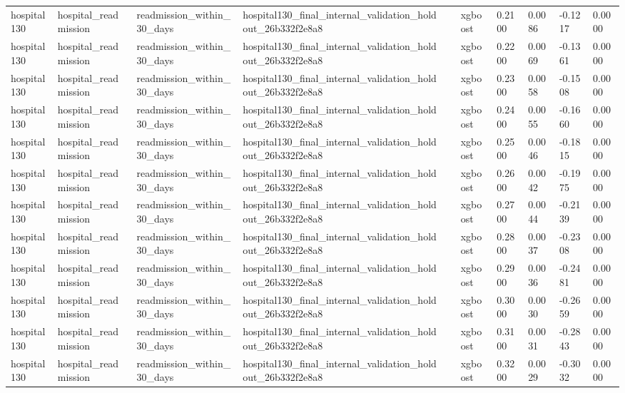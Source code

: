 \begin{tabular}{llllllllll}
hospital130 & hospital\_readmission & readmission\_within\_30\_days & hospital130\_final\_internal\_validation\_holdout\_26b332f2e8a8 &  & xgboost & 0.2100 & 0.0086 & -0.1217 & 0.0000 \\
hospital130 & hospital\_readmission & readmission\_within\_30\_days & hospital130\_final\_internal\_validation\_holdout\_26b332f2e8a8 &  & xgboost & 0.2200 & 0.0069 & -0.1361 & 0.0000 \\
hospital130 & hospital\_readmission & readmission\_within\_30\_days & hospital130\_final\_internal\_validation\_holdout\_26b332f2e8a8 &  & xgboost & 0.2300 & 0.0058 & -0.1508 & 0.0000 \\
hospital130 & hospital\_readmission & readmission\_within\_30\_days & hospital130\_final\_internal\_validation\_holdout\_26b332f2e8a8 &  & xgboost & 0.2400 & 0.0055 & -0.1660 & 0.0000 \\
hospital130 & hospital\_readmission & readmission\_within\_30\_days & hospital130\_final\_internal\_validation\_holdout\_26b332f2e8a8 &  & xgboost & 0.2500 & 0.0046 & -0.1815 & 0.0000 \\
hospital130 & hospital\_readmission & readmission\_within\_30\_days & hospital130\_final\_internal\_validation\_holdout\_26b332f2e8a8 &  & xgboost & 0.2600 & 0.0042 & -0.1975 & 0.0000 \\
hospital130 & hospital\_readmission & readmission\_within\_30\_days & hospital130\_final\_internal\_validation\_holdout\_26b332f2e8a8 &  & xgboost & 0.2700 & 0.0044 & -0.2139 & 0.0000 \\
hospital130 & hospital\_readmission & readmission\_within\_30\_days & hospital130\_final\_internal\_validation\_holdout\_26b332f2e8a8 &  & xgboost & 0.2800 & 0.0037 & -0.2308 & 0.0000 \\
hospital130 & hospital\_readmission & readmission\_within\_30\_days & hospital130\_final\_internal\_validation\_holdout\_26b332f2e8a8 &  & xgboost & 0.2900 & 0.0036 & -0.2481 & 0.0000 \\
hospital130 & hospital\_readmission & readmission\_within\_30\_days & hospital130\_final\_internal\_validation\_holdout\_26b332f2e8a8 &  & xgboost & 0.3000 & 0.0030 & -0.2659 & 0.0000 \\
hospital130 & hospital\_readmission & readmission\_within\_30\_days & hospital130\_final\_internal\_validation\_holdout\_26b332f2e8a8 &  & xgboost & 0.3100 & 0.0031 & -0.2843 & 0.0000 \\
hospital130 & hospital\_readmission & readmission\_within\_30\_days & hospital130\_final\_internal\_validation\_holdout\_26b332f2e8a8 &  & xgboost & 0.3200 & 0.0029 & -0.3032 & 0.0000 \\

\end{tabular}

